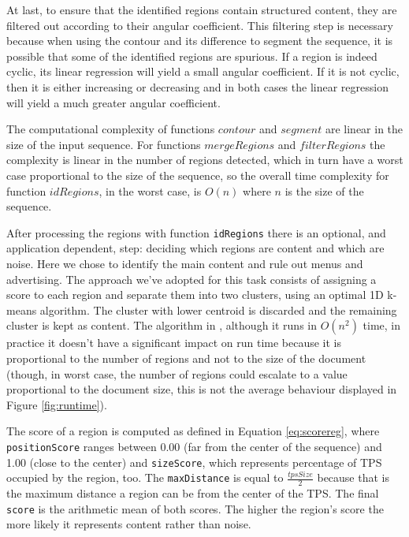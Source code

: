 \documentclass{vldb}
\begin{document}
At last, to ensure that the identified regions contain structured content, they
are filtered out according to their angular coefficient. This filtering step is
necessary because when using the contour and its difference to segment the
sequence, it is possible that some of the identified regions are spurious. If a
region is indeed cyclic, its linear regression will yield a small angular
coefficient. If it is not cyclic, then it is either increasing or decreasing and
in both cases the linear regression will yield a much greater angular
coefficient.

The computational complexity of functions $contour$ and $segment$ are linear in
the size of the input sequence. For functions $mergeRegions$ and $filterRegions$
the complexity is linear in the number of regions detected, which in turn have a
worst case proportional to the size of the sequence, so the overall time
complexity for function $idRegions$, in the worst case, is $O(n)$ where $n$ is
the size of the sequence.

After processing the regions with function \texttt{idRegions} there is an
optional, and application dependent, step: deciding which regions are content
and which are noise. Here we chose to identify the main content and rule out
menus and advertising. The approach we've adopted for this task consists of
assigning a score to each region and separate them into two clusters, using an
optimal 1D k-means algorithm\cite{1dkmeans2011}. The cluster with lower centroid
is discarded and the remaining cluster is kept as content. The algorithm in
\cite{1dkmeans2011}, although it runs in $O(n^2)$ time, in practice it doesn't
have a significant impact on run time because it is proportional to the number
of regions and not to the size of the document (though, in worst case, the
number of regions could escalate to a value proportional to the document size,
this is not the average behaviour displayed in Figure \ref{fig:runtime}).

The score of a region is computed as defined in Equation \ref{eq:scorereg},
where \texttt{positionScore} ranges between 0.00 (far from the center of the sequence)
and 1.00 (close to the center) and \texttt{sizeScore}, which represents
percentage of TPS occupied by the region, too. The \texttt{maxDistance} is equal
to $\frac{tpsSize}{2}$ because that is the maximum distance a region can be from
the center of the TPS. The final \texttt{score} is the arithmetic mean of both
scores. The higher the region's score the more likely it represents content
rather than noise.
\end{document}
